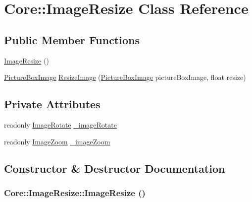 \hypertarget{class_core_1_1_image_resize}{
\section{Core::ImageResize Class Reference}
\label{class_core_1_1_image_resize}
}
\subsection*{Public Member Functions}
\begin{DoxyCompactItemize}
\item 
\hyperlink{class_core_1_1_image_resize_a16937ad75fcc3f855617e6f50710a627}{ImageResize} ()
\item 
\hyperlink{class_core_1_1_images_1_1_picture_box_image}{PictureBoxImage} \hyperlink{class_core_1_1_image_resize_a065ad1dea161a50312691fdb8ebce61f}{ResizeImage} (\hyperlink{class_core_1_1_images_1_1_picture_box_image}{PictureBoxImage} pictureBoxImage, float resize)
\end{DoxyCompactItemize}
\subsection*{Private Attributes}
\begin{DoxyCompactItemize}
\item 
readonly \hyperlink{class_core_1_1_image_rotate}{ImageRotate} \hyperlink{class_core_1_1_image_resize_a6946fcbd49fd5eed96947e7f2a5974d5}{\_\-imageRotate}
\item 
readonly \hyperlink{class_core_1_1_image_zoom}{ImageZoom} \hyperlink{class_core_1_1_image_resize_a8a1b34545392d187bf7fb5c66c37bbc5}{\_\-imageZoom}
\end{DoxyCompactItemize}


\subsection{Constructor \& Destructor Documentation}
\hypertarget{class_core_1_1_image_resize_a16937ad75fcc3f855617e6f50710a627}{
\subsubsection[{ImageResize}]{\setlength{\rightskip}{0pt plus 5cm}Core::ImageResize::ImageResize ()}}
\label{class_core_1_1_image_resize_a16937ad75fcc3f855617e6f50710a627}


